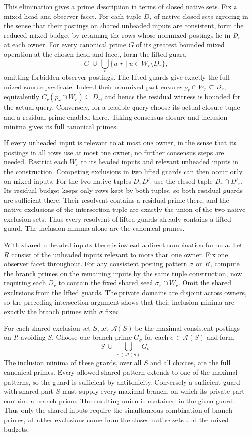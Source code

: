 This elimination gives a prime description in terms of
closed native sets. Fix a mixed head and observer facet.
For each tuple $D_r$ of native closed sets agreeing in
the sense that their postings on shared unheaded inputs
are consistent, form the reduced mixed budget by retaining
the rows whose nonmixed postings lie in $D_r$ at each
owner. For every canonical prime $G$ of its greatest
bounded mixed operation at the chosen head and facet,
form the lifted guard
\[
 G\ \cup\ \bigcup_r\{u:r\mid u\in W_r\setminus D_r\},
\]
omitting forbidden observer postings. The lifted guards
give exactly the full mixed source predicate. Indeed their
nonmixed part ensures $p_r\cap W_r\subseteq D_r$, equivalently
$C_r(p_r\cap W_r)\subseteq D_r$, and hence the residual
witness is bounded for the actual query. Conversely, for
a feasible query choose its actual closure tuple and a
residual prime enabled there. Taking consensus closure
and inclusion minima gives its full canonical primes.

If every unheaded input is relevant to at most one owner,
in the sense that its postings in all rows use at most
one owner, no further consensus steps are needed. Restrict
each $W_r$ to its headed inputs and relevant unheaded
inputs in the construction. Competing exclusions in two
lifted guards can then occur only on mixed inputs. For
the two native tuples $D,D'$, use the closed tuple
$D_r\cap D'_r$. Its residual budget keeps only rows kept
by both tuples, so both residual guards are sufficient
there. Their resolvent contains a residual prime there,
and the native exclusions of the intersection tuple are
exactly the union of the two native exclusion sets.
Thus every resolvent of lifted guards already contains
a lifted guard. The inclusion minima alone are the
canonical primes.

With shared unheaded inputs there is instead a direct
combination formula. Let $R$ consist of the unheaded
inputs relevant to more than one owner. Fix one observer
facet throughout. For any consistent posting pattern
$\sigma$ on $R$, compute the branch primes on the
remaining inputs by the same tuple construction, now
requiring each $D_r$ to contain the fixed shared seed
$\sigma_r\cap W_r$. Omit the shared exclusions from
the lifted guards. The private domains are disjoint
across owners, so the preceding intersection argument
shows that their inclusion minima are exactly the branch
primes with $\sigma$ fixed.

For each shared exclusion set $S$, let $\mathcal A(S)$
be the maximal consistent postings on $R$ avoiding $S$.
Choose one branch prime $G_\sigma$ for each
$\sigma\in\mathcal A(S)$ and form
\[
                 S\ \cup\ \bigcup_{\sigma\in\mathcal A(S)}G_\sigma .
\]
The inclusion minima of these guards, over all $S$ and
all choices, are the full canonical primes. Every
allowed shared pattern extends to one of the maximal
patterns, so the guard is sufficient by antitonicity.
Conversely a sufficient guard with shared part $S$
must supply every maximal branch, on which its private
part contains a branch prime. The resulting union is
contained in the given guard. Thus only the shared inputs
require the simultaneous combination of branch primes;
all other exclusions come from the closed native sets
and the mixed budgets.

